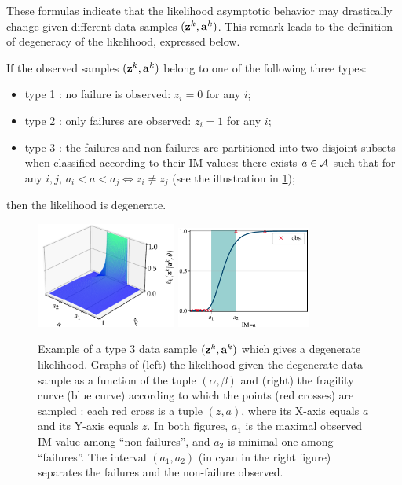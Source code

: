 %
These formulas indicate that the likelihood asymptotic behavior may drastically change given different data samples $(\mathbf{z}^k,\mathbf{a}^k)$.
This remark leads to the definition of degeneracy of the likelihood, expressed below.


\begin{defi}\label{def:constr-frag:degeneracy}
    If the observed samples $(\mathbf{z}^k,\mathbf{a}^k)$ belong to one of the following three types:
    \begin{itemize}
        \item
        type 1 : no failure is observed: $z_i=0$ for any $i$;
        \item type 2 : only failures are observed: $z_i=1$ for any $i$;
        \item type 3 : the failures and non-failures are partitioned into two disjoint subsets when classified according to their IM values:
        there exists $a\in\mathcal{A}$ such that for any $i,j$, $a_i<a<a_j\Longleftrightarrow z_i\ne z_j$ (see the illustration in \cref{fig:constr-frags:degenerate-frag});
    \end{itemize}
    then the likelihood is degenerate.
\end{defi}


\begin{figure}[h]
    \centering
    \includegraphics[width=4.6cm]{figures/PREM/likelihood_degen.pdf}\qquad
    \includegraphics[width=4.44cm]{figures/PREM/degeneracy.pdf}
    \caption{{Example of a type 3 data sample $(\mathbf{z}^k,\mathbf{a}^k)$ which gives a degenerate likelihood. Graphs of (left) the likelihood given the degenerate data sample as a function of the tuple $(\alpha,\beta)$ and (right) the fragility curve (blue curve) according to which the points (red crosses) are sampled : each red cross is a tuple $(z,a)$, where its X-axis equals $a$ and its Y-axis equals $z$.}
    In both figures, $a_1$ is the maximal observed IM value among ``non-failures'', and $a_2$ is minimal one among ``failures''.
    The interval $(a_1,a_2)$ (in cyan in the right figure) separates the failures and the non-failure observed.
    }
    \label{fig:constr-frags:degenerate-frag}
\end{figure}



